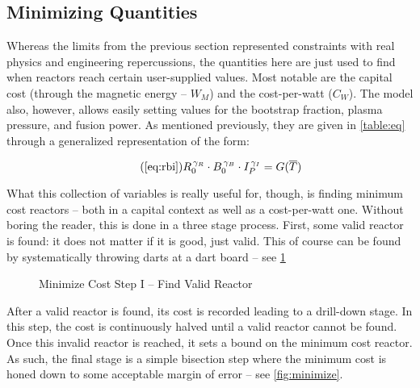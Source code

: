 \subsection{Minimizing  Quantities} 

Whereas the limits from the previous section represented constraints with real physics and engineering repercussions, the  quantities here are just used to find when reactors reach certain user-supplied values. Most notable are the capital cost (through the magnetic energy -- $W_M$) and the cost-per-watt ($C_W$). The model also, however, allows easily setting values for the bootstrap fraction, plasma pressure, and fusion power. As mentioned previously, they are given in \cref{table:eq} through a generalized representation of the form:

\begin{equation}
	\tag{\ref{eq:rbi}}
	R_0^{\, \gamma_R} \cdot B_0^{\, \gamma_B} \cdot I_P^{\, \gamma_I} = G( \overline T )
\end{equation}

What this collection of variables is really useful for, though, is finding minimum cost reactors -- both in a capital context as well as a cost-per-watt one. Without boring the reader, this is done in a three stage process. First, some valid reactor is found: it does not matter if it is good, just valid. This of course can be found by systematically throwing darts at a dart board -- see \cref{fig:step_one}

\begin{figure}[h]
\centering
\begin{adjustbox}{width=0.8\textwidth}
	
\end{adjustbox}
\caption{Minimize Cost Step I -- Find Valid Reactor}
\label{fig:step_one}
\end{figure}

After a valid reactor is found, its cost is recorded leading to a drill-down stage. In this step, the cost is continuously halved until a valid reactor cannot be found. Once this invalid reactor is reached, it sets a bound on the minimum cost reactor. As such, the final stage is a simple bisection step where the minimum cost is honed down to some acceptable margin of error -- see \cref{fig:minimize}.

